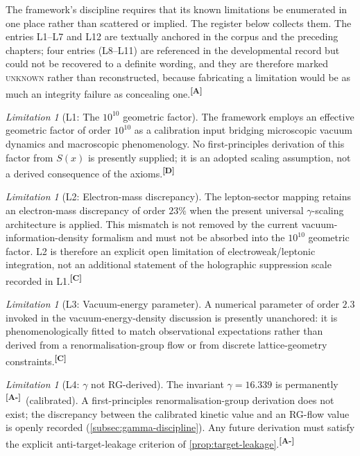 \documentclass[12pt,a4paper,twoside]{article}
\theoremstyle{plain}
\theoremstyle{definition}
\theoremstyle{remark}
\newtheorem{limitation}[theorem]{Limitation}
\newcommand{\catmark}[1]{\textsuperscript{\textsf{\textbf{[#1]}}}}
\newcommand{\Sx}{S(x)}
\newcommand{\GammaGeom}{16.339} %
\begin{document}
The framework's discipline requires that its known limitations be enumerated in one place rather than scattered or implied. The register below collects them. The entries L1--L7 and L12 are textually anchored in the corpus and the preceding chapters; four entries (L8--L11) are referenced in the developmental record but could not be recovered to a definite wording, and they are therefore marked \textsc{unknown} rather than reconstructed, because fabricating a limitation would be as much an integrity failure as concealing one.\catmark{A}

\begin{limitation}[L1: The $10^{10}$ geometric factor]
\label{lim:L1}
The framework employs an effective geometric factor of order $10^{10}$ as a calibration input bridging microscopic vacuum dynamics and macroscopic phenomenology. No first-principles derivation of this factor from $\Sx$ is presently supplied; it is an adopted scaling assumption, not a derived consequence of the axioms.\catmark{D}
\end{limitation}

\begin{limitation}[L2: Electron-mass discrepancy]
\label{lim:L2}
The lepton-sector mapping retains an electron-mass discrepancy of order $23\%$ when the present universal $\gamma$-scaling architecture is applied. This mismatch is not removed by the current vacuum-information-density formalism and must not be absorbed into the $10^{10}$ geometric factor. L2 is therefore an explicit open limitation of electroweak/leptonic integration, not an additional statement of the holographic suppression scale recorded in L1.\catmark{C}
\end{limitation}

\begin{limitation}[L3: Vacuum-energy parameter]
\label{lim:L3}
A numerical parameter of order $2.3$ invoked in the vacuum-energy-density discussion is presently unanchored: it is phenomenologically fitted to match observational expectations rather than derived from a renormalisation-group flow or from discrete lattice-geometry constraints.\catmark{C}
\end{limitation}

\begin{limitation}[L4: $\gamma$ not RG-derived]
\label{lim:L4}
The invariant $\gamma = \GammaGeom$ is permanently \catmark{A-}\ (calibrated). A first-principles renormalisation-group derivation does not exist; the discrepancy between the calibrated kinetic value and an RG-flow value is openly recorded (\cref{subsec:gamma-discipline}). Any future derivation must satisfy the explicit anti-target-leakage criterion of \cref{prop:target-leakage}.\catmark{A-}
\end{limitation}
\end{document}
